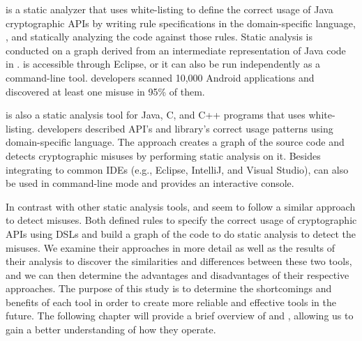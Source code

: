 \cognicryptsast{} \cite{skm19} is a static analyzer that uses white-listing to define the correct usage of Java cryptographic APIs by writing rule specifications in the domain-specific language, \crysl{}, and statically analyzing the code against those rules. Static analysis is conducted on a graph derived from an intermediate representation of Java code in \cognicryptsast{}. \cognicryptsast{} is accessible through Eclipse, or it can also be run independently as a command-line tool. \cognicryptsast{} developers scanned 10,000 Android applications and discovered at least one misuse in 95\% of them.

\codyze{} \cite{cod} is also a static analysis tool for Java, C, and C++ programs that uses white-listing. \codyze{} developers described API's and library's correct usage patterns using \mark{} domain-specific language. The approach creates a graph of the source code and detects cryptographic misuses by performing static analysis on it. Besides integrating to common IDEs (e.g., Eclipse, IntelliJ, and Visual Studio), \codyze{} can also be used in command-line mode and provides an interactive console.


In contrast with other static analysis tools, \cognicryptsast{} and \codyze{} seem to follow a similar approach to detect misuses. Both defined rules to specify the correct usage of cryptographic APIs using DSLs and build a graph of the code to do static analysis to detect the misuses. We examine their approaches in more detail as well as the results of their analysis to discover the similarities and differences between these two tools, and we can then determine the advantages and disadvantages of their respective approaches. The purpose of this study is to determine the shortcomings and benefits of each tool in order to create more reliable and effective tools in the future. The following chapter will provide a brief overview of \codyze{} and \cognicryptsast{}, allowing us to gain a better understanding of how they operate.
